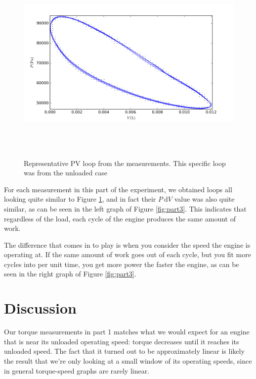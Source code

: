 \documentclass[a4paper]{scrartcl}
\begin{document}
\begin{figure}
    \centering
    \includegraphics[height = 10cm]{part3/unloaded.png}
    \caption{Representative PV loop from the measurements. This specific loop was from the unloaded case}
    \label{fig:part3-loop}
\end{figure}

For each measurement in this part of the experiment, we obtained loops all looking quite similar to Figure \ref{fig:part3-loop}, and in fact their \(P \:\mathrm{d}V\) value was also quite similar, as can be seen in the left graph of Figure \ref{fig:part3}. This indicates that regardless of the load, each cycle of the engine produces the same amount of work.

The difference that comes in to play is when you consider the speed the engine is operating at. If the same amount of work goes out of each cycle, but you fit more cycles into per unit time, you get more power the faster the engine, as can be seen in the right graph of Figure \ref{fig:part3}.

\section{Discussion}
Our torque measurements in part 1 matches what we would expect for an engine that is near its unloaded operating speed: torque decreases until it reaches its unloaded speed. The fact that it turned out to be approximately linear is likely the result that we're only looking at a small window of its operating speeds, since in general torque-speed graphs are rarely linear.
\end{document}
